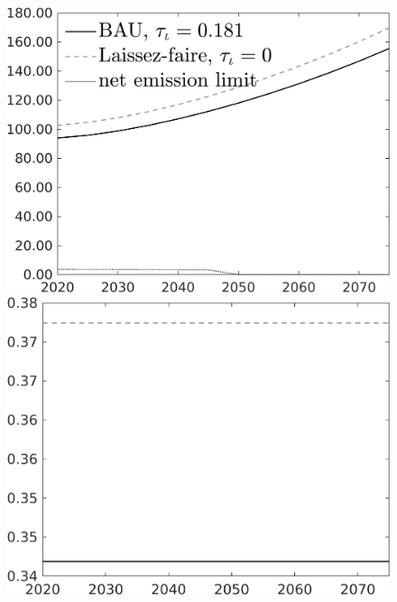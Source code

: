 \documentclass[12pt]{article}
\begin{document}
\begin{figure}[h!!]
	\begin{minipage}[]{0.32\textwidth}
		\includegraphics[width=1\textwidth]{../../codding_model/own_basedOnFried/optimalPol_010922_revision/figures/all_13Sept22/CompTaul_Equlab_LFBAU_Reg0_Emnet_spillover0_nsk1_xgr0_knspil0_sep1_countec0_GovRev0_etaa0.79_lgd1.png}
	\end{minipage}	
	\begin{minipage}[]{0.32\textwidth}
		\includegraphics[width=1\textwidth]{../../codding_model/own_basedOnFried/optimalPol_010922_revision/figures/all_13Sept22/CompTaul_Equlab_LFBAU_Reg0_hh_spillover0_nsk1_xgr0_knspil0_sep1_countec0_GovRev0_etaa0.79_lgd0.png}

\end{minipage}
\end{figure}
\end{document}

